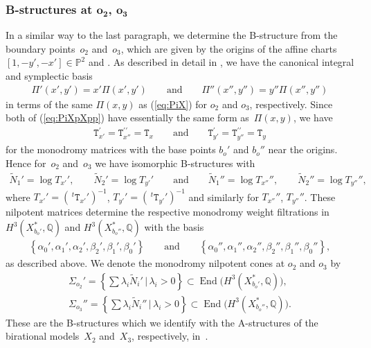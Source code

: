 \documentclass[pdftex]{sigma}
\numberwithin{equation}{section}
\begin{document}
\subsubsection[B-structures at $o_2$, $o_3$]{B-structures at $\boldsymbol{o_2}$, $\boldsymbol{o_3}$} \label{para: B-str-23} In a similar way to the last paragraph, we determine the B-structure from the boundary points~$o_{2}$ and~$o_{3}$, which are given by the origins of the affine charts $[1,-y',-x']\in\mathbb{P}^{2}$ and . As described in detail in \cite[Section~6.3.1]{HTcmp}, we have the canonical integral and symplectic basis
\begin{gather}
\Pi'(x',y')=x'\Pi(x',y')\qquad \text{and} \qquad \Pi''(x'',y'')=y''\Pi(x'',y'')\label{eq:PiXpXpp}
\end{gather}
in terms of the same $\Pi(x,y)$ as (\ref{eq:PiX}) for $o_{2}$ and $o_{3}$, respectively. Since both of (\ref{eq:PiXpXpp}) have essentially the same form as~$\Pi(x,y)$, we have
\begin{gather}
\mathtt{T}_{x'}^{\prime}=\mathtt{T}_{x''}^{\prime\prime}=\mathtt{T}_{x}\qquad \text{and} \qquad \mathtt{T}_{y'}^{\prime}=\mathtt{T}_{y''}^{\prime\prime}=\mathtt{T}_{y}\label{eq:TxTyForAll}
\end{gather}
for the monodromy matrices with the base points $b_{o}'$ and $b_{o}''$ near the origins. Hence for~$o_{2}$ and~$o_{3}$ we have isomorphic
B-structures with
\begin{gather*}
\tilde{N}_{1}'=\log T_{x'}',\qquad \tilde{N}_{2}'=\log T_{y'}'\qquad \text{and} \qquad \tilde{N}_{1}''=\log T_{x''}'',\qquad \tilde{N}_{2}''=\log T_{y''}'',
\end{gather*}
where $T_{x'}'=(\,^{t}\mathtt{T}_{x'}')^{-1}$, $T_{y'}'=(\,^{t}\mathtt{T}_{y'}')^{-1}$ and similarly for $T_{x''}''$, $T_{y''}''$. These nilpotent matrices determine the respective monodromy weight filtrations in $H^{3}(X_{b_{o}'}^{*},\mathbb{Q})$ and $H^{3}(X_{b_{o}''}^{*},\mathbb{Q})$ with the basis
\begin{gather}
\left\{ \alpha_{0}',\alpha_{1}',\alpha_{2}',\beta_{2}',\beta_{1}',\beta_{0}'\right\} \qquad \text{and} \qquad \left\{ \alpha_{0}'',\alpha_{1}'',\alpha_{2}'',\beta_{2}'',\beta_{1}'',\beta_{0}''\right\} ,\label{eq:base-B23}
\end{gather}
as described above. We denote the monodromy nilpotent cones at $o_{2}$ and $o_{3}$ by
\begin{gather}
\Sigma_{o_{2}}'=\left\{ \sum\lambda_{i}\tilde{N}_{i}'\,|\,\lambda_{i}>0\right\} \subset\operatorname{End}\big(H^{3}(X_{b_{o}'}^{*},\mathbb{Q})\big),\nonumber\\
\Sigma_{o_{3}}''=\left\{ \sum\lambda_{i}\tilde{N}_{i}''\,|\,\lambda_{i}>0\right\} \subset\operatorname{End}\big(H^{3}(X_{b_{o}''}^{*},\mathbb{Q})\big).
\label{eq:Cones23}
\end{gather}
These are the B-structures which we identify with the A-structures of the birational models~$X_{2}$ and~$X_{3}$, respectively, in~\cite{HTcmp}.
\end{document}
